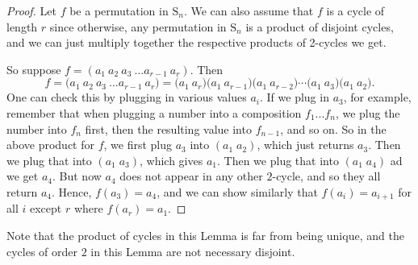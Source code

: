 \documentclass[11pt,dvipsnames]{book}
\numberwithin{equation}{section} %
\numberwithin{figure}{section} %
\numberwithin{table}{section} %
\begin{document}
\begin{proof}  Let $f$ be a permutation in
$\mathrm{S}_n$. We can also assume that $f$ is a cycle of length $r$ since otherwise, any permutation in $\mathrm{S}_n$ is a product of
disjoint cycles, and we can just multiply together the respective products of 2-cycles we get.

So suppose $f=(a_1\ a_2\ a_3\ \ldots a_{r-1}\ a_r)$. 
Then
$$
f=\big(a_1\ a_2\ a_3\ \ldots a_{r-1}\ a_r\big)=\big(a_1\ a_{r}\big)\big(a_1\ a_{r-1}\big)\big(a_1\ a_{r-2}\big)\cdots \big(a_1\ a_{3}\big)\big(a_1\ a_{2}\big).%
$$
One can check this by plugging in various values $a_i$. If we plug in $a_3$, for example, remember that when plugging a number into a composition $f_{1}...f_{n}$, we plug the number into $f_n$ first, then the resulting value into $f_{n-1}$, and so on. So in the above product for $f$, we first plug $a_3$ into $(a_{1}\; a_{2})$, which just returns $a_{3}$. Then we plug that into $(a_{1}\; a_{3})$, which gives $a_{1}$. Then we plug that into $(a_{1}\; a_{4})$ ad we get $a_{4}$. But now $a_{4}$ does not appear in any other $2$-cycle, and so they all return $a_{4}$. Hence, $f(a_{3})=a_{4}$, and we can show similarly that $f(a_{i})=a_{i+1}$ for all $i$ except $r$ where $f(a_{r})=a_{1}$.
\end{proof}

Note that the product of cycles in this Lemma is far from being
unique, and the cycles of order $2$ in this Lemma are not necessary
disjoint.



%
%
%
%
%
%
%
%
%
%
%
\end{document}
